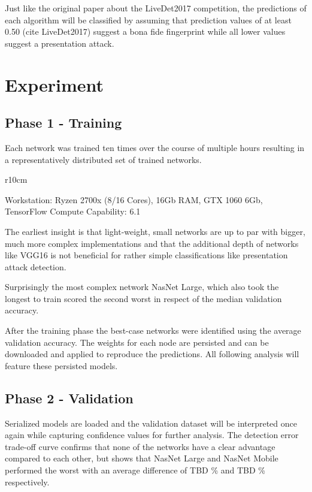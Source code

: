 Just like the original paper about the LiveDet2017 competition, the predictions of each algorithm will be classified by assuming that prediction values of at least 0.50 (cite LiveDet2017) suggest a bona fide fingerprint while all lower values suggest a presentation attack.



\section{Experiment}
\subsection{Phase 1 - Training}

Each network was trained ten times over the course of multiple hours resulting in a representatively distributed set of trained networks.

\begin{wrapfigure}[10]{r}{10cm}
    \vspace{-10mm} 
    
    \vspace{2mm}
    Workstation: Ryzen 2700x (8/16 Cores), 16Gb RAM, GTX 1060 6Gb, TensorFlow Compute Capability: 6.1
\end{wrapfigure}
\smallskip\noindent
The earliest insight is that light-weight, small networks are up to par with bigger, much more complex implementations and that the additional depth of networks like VGG16 is not beneficial for rather simple classifications like presentation attack detection.

\noindent
Surprisingly the most complex network NasNet Large, which also took the longest to train scored the second worst in respect of the median validation accuracy.

\noindent
After the training phase the best-case networks were identified using the average validation accuracy.
The weights for each node are persisted and can be downloaded and applied to reproduce the predictions.
All following analysis will feature these persisted models.


\subsection{Phase 2 - Validation}
Serialized models are loaded and the validation dataset will be interpreted once again while capturing confidence values for further analysis.
The detection error trade-off curve confirms that none of the networks have a clear advantage compared to each other, but shows that NasNet Large and NasNet Mobile performed the worst with an average difference of TBD \% and TBD \% respectively.

